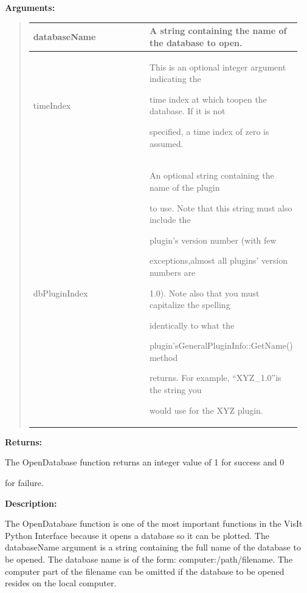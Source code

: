 \documentclass[letterpaper,10pt,english]{sphinxmanual}
\begin{document}
\begin{DUlineblock}{0em}
\item[] 
\item[] \textbf{Arguments:}
\end{DUlineblock}
\begin{quote}

\begin{tabular}{|p{0.475\linewidth}|p{0.475\linewidth}|}
\hline

databaseName
 & 
A string containing the name of the database to open.
\\
\hline
timeIndex
 & 
\begin{DUlineblock}{0em}
\item[] This is an optional integer argument indicating the
\item[] time index at which toopen the database. If it is not
\item[] specified, a time index of zero is assumed.
\end{DUlineblock}
\\
\hline
dbPluginIndex
 & 
\begin{DUlineblock}{0em}
\item[] An optional string containing the name of the plugin
\item[] to use. Note that this string must also include the
\item[] plugin's version number (with few
\item[] exceptions,almost all plugins' version numbers are
\item[] 1.0). Note also that you must capitalize the spelling
\item[] identically to what the
\item[] plugin'sGeneralPluginInfo::GetName() method
\item[] returns. For example, ``XYZ\_1.0''is the string you
\item[] would use for the XYZ plugin.
\end{DUlineblock}
\\
\hline\end{tabular}

\end{quote}

\begin{DUlineblock}{0em}
\item[] 
\item[] \textbf{Returns:}
\item[] The OpenDatabase function returns an integer value of 1 for success and 0
\item[] for failure.
\item[] 
\item[] \textbf{Description:}
\item[] The OpenDatabase function is one of the most important functions in the
VisIt Python Interface because it opens a database so it can be plotted.
The databaseName argument is a string containing the full name of the
database to be opened. The database name is of the form:
computer:/path/filename. The computer part of the filename can be omitted
if the database to be opened resides on the local computer.
\end{DUlineblock}
\end{document}

